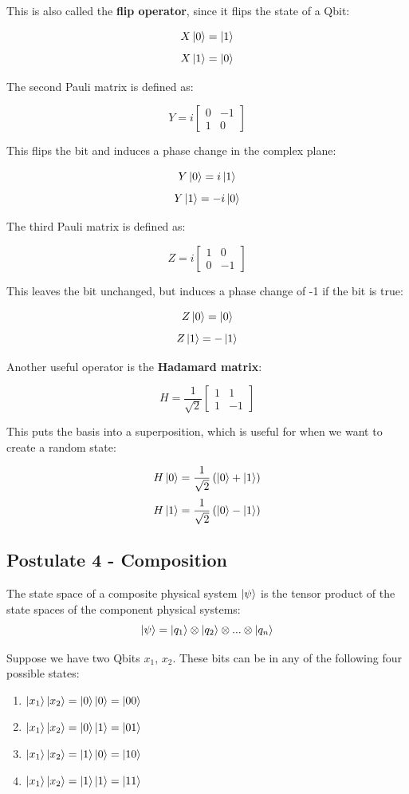 \documentclass[12pt]{article}
\begin{document}
\noindent
This is also called the \textbf{flip operator}, since it flips the state of a Qbit:

\[ X\ket{0} = \ket{1} \]
\[ X\ket{1} = \ket{0} \]

\noindent
The second Pauli matrix is defined as:

\[ Y = i\begin{bmatrix}
    0 & -1 \\
    1 & 0
\end{bmatrix} \]

\noindent
This flips the bit and induces a phase change in the complex plane:

\[ Y\ket{0} = i\ket{1} \]
\[ Y\ket{1} = -i\ket{0} \]

\noindent
The third Pauli matrix is defined as:

\[ Z = i\begin{bmatrix}
    1 & 0 \\
    0 & -1
\end{bmatrix} \]

\noindent
This leaves the bit unchanged, but induces a phase change of -1 if the bit is true:

\[ Z\ket{0} = \ket{0} \]
\[ Z\ket{1} = -\ket{1} \]

\noindent
Another useful operator is the \textbf{Hadamard matrix}:

\[ H = \frac{1}{\sqrt{2}} \begin{bmatrix}
    1 & 1 \\
    1 & -1
\end{bmatrix} \]

\newpage
\noindent
This puts the basis into a superposition, which is useful for when we want to create a random state:

\[ H\ket{0} = \frac{1}{\sqrt{2}} \left( \ket{0} + \ket{1} \right) \]
\[ H\ket{1} = \frac{1}{\sqrt{2}} \left( \ket{0} - \ket{1} \right) \]

\subsection*{Postulate 4 - Composition}
The state space of a composite physical system $\ket{\psi}$ is the tensor product of the state spaces of the component physical systems:
\[ \ket{\psi} = \ket{q_1} \otimes \ket{q_2} \otimes ... \otimes \ket{q_n} \]

\noindent
Suppose we have two Qbits $x_1$, $x_2$.
These bits can be in any of the following four possible states:

\begin{enumerate}
    \item $\ket{x_1}\ket{x_2} = \ket{0}\ket{0} = \ket{00}$
    \item $\ket{x_1}\ket{x_2} = \ket{0}\ket{1} = \ket{01}$
    \item $\ket{x_1}\ket{x_2} = \ket{1}\ket{0} = \ket{10}$
    \item $\ket{x_1}\ket{x_2} = \ket{1}\ket{1} = \ket{11}$
\end{enumerate}
\end{document}
